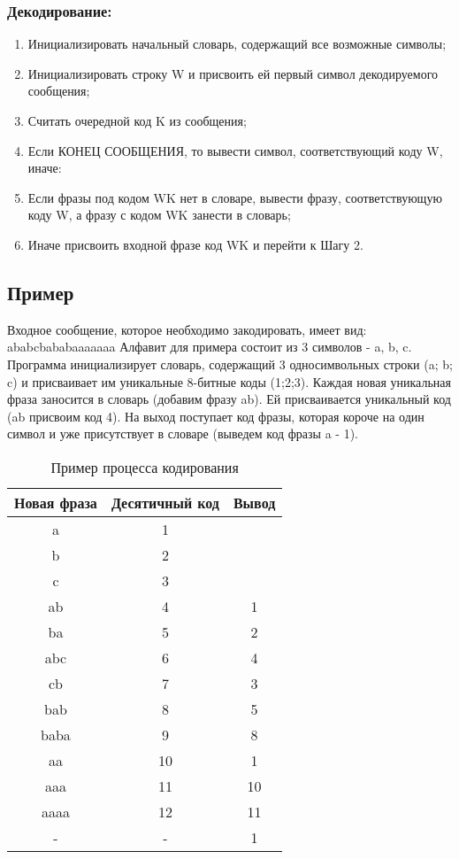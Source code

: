 \documentclass[a4paper]{article}
\begin{document}
\subsubsection{Декодирование:}
\begin{enumerate}
\item Инициализировать начальный словарь, содержащий все возможные символы;
\item Инициализировать строку W и присвоить ей первый символ декодируемого сообщения;
\item Считать очередной код K из сообщения;
\item Если КОНЕЦ СООБЩЕНИЯ, то вывести символ, соответствующий коду W, иначе:
\item Если фразы под кодом WK нет в словаре, вывести фразу, соответствующую коду W, а фразу с кодом WK занести в словарь;
\item Иначе присвоить входной фразе код WK и перейти к Шагу 2.
\end{enumerate}

\newpage
\subsection{Пример}
Входное сообщение, которое необходимо закодировать, имеет вид:
ababcbababaaaaaaa
Алфавит для примера состоит из 3 символов - {a, b, c}.
Программа инициализирует словарь, содержащий 3 односимвольных строки (a; b; c) и присваивает им уникальные 8-битные коды (1;2;3). Каждая новая уникальная фраза заносится в словарь (добавим фразу ab). Ей присваивается уникальный код (ab присвоим код 4). На выход поступает код фразы, которая короче на один символ и уже присутствует в словаре (выведем код фразы a - 1).


\begin{table}[h]
\centering
\begin{tabular}{ |c|c|c| } 
 \hline
 Новая фраза & Десятичный код & Вывод \\
 \hline\hline
 a & 1 &  \\
 \hline
 b & 2 &  \\
 \hline
 c & 3 &  \\
 \hline
 ab & 4 & 1 \\
 \hline
 ba & 5 & 2 \\
 \hline
 abc & 6 & 4 \\
 \hline
 cb & 7 & 3 \\
 \hline
 bab & 8 & 5 \\
 \hline
 baba & 9 & 8 \\
 \hline
 aa & 10 & 1 \\
 \hline
 aaa & 11 & 10 \\
 \hline
 aaaa & 12 & 11 \\
 \hline
 - & - & 1 \\
 \hline
\end{tabular}
\caption{\label{tab:widgets}Пример процесса кодирования}
\end{table}
\end{document}
